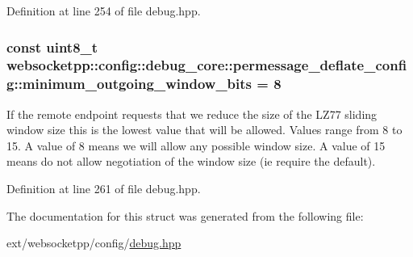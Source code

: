 Definition at line 254 of file debug.\+hpp.

\hypertarget{structwebsocketpp_1_1config_1_1debug__core_1_1permessage__deflate__config_ae9ce7b9a7a002339d80dca046e940867}{}
\subsubsection[{minimum\+\_\+outgoing\+\_\+window\+\_\+bits}]{\setlength{\rightskip}{0pt plus 5cm}const uint8\+\_\+t websocketpp\+::config\+::debug\+\_\+core\+::permessage\+\_\+deflate\+\_\+config\+::minimum\+\_\+outgoing\+\_\+window\+\_\+bits = 8\hspace{0.3cm}{\ttfamily [static]}}\label{structwebsocketpp_1_1config_1_1debug__core_1_1permessage__deflate__config_ae9ce7b9a7a002339d80dca046e940867}
If the remote endpoint requests that we reduce the size of the L\+Z77 sliding window size this is the lowest value that will be allowed. Values range from 8 to 15. A value of 8 means we will allow any possible window size. A value of 15 means do not allow negotiation of the window size (ie require the default). 

Definition at line 261 of file debug.\+hpp.



The documentation for this struct was generated from the following file\+:\begin{DoxyCompactItemize}
\item 
ext/websocketpp/config/\hyperlink{debug_8hpp}{debug.\+hpp}\end{DoxyCompactItemize}
